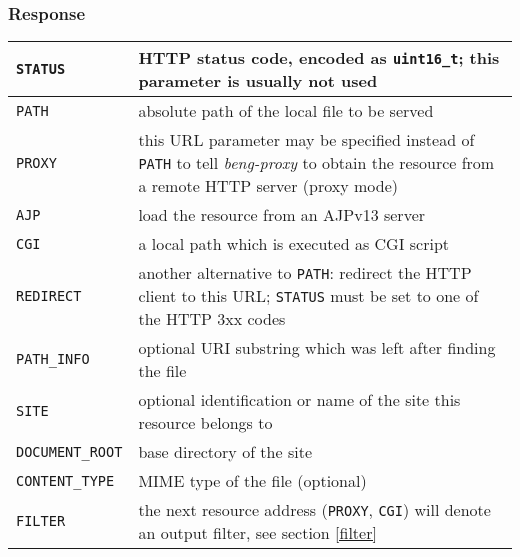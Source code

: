 \documentclass[a4paper,12pt]{article}
\begin{document}
\subsubsection{Response}

\begin{tabular}{|l|p{10cm}|}
\hline
\texttt{STATUS} & HTTP status code, encoded as \texttt{uint16\_t};
this parameter is usually not used \\
\hline

\texttt{PATH} & absolute path of the local file to be served \\

\hline

\texttt{PROXY} & this URL parameter may be specified instead of
\texttt{PATH} to tell \emph{beng-proxy} to obtain the resource from a
remote HTTP server (proxy mode) \\

\hline

\texttt{AJP} & load the resource from an AJPv13 server \\

\hline

\texttt{CGI} & a local path which is executed as CGI script \\

\hline

\texttt{REDIRECT} & another alternative to \texttt{PATH}: redirect the
HTTP client to this URL; \texttt{STATUS} must be set to one of the
HTTP 3xx codes \\

\hline

\texttt{PATH\_INFO} & optional URI substring which was left after
finding the file \\

\hline

\texttt{SITE} & optional identification or name of the site this
resource belongs to \\

\hline

\texttt{DOCUMENT\_ROOT} & base directory of the site \\

\hline

\texttt{CONTENT\_TYPE} & MIME type of the file (optional) \\

\hline

\texttt{FILTER} & the next resource address (\texttt{PROXY},
\texttt{CGI}) will denote an output filter, see section \ref{filter}
\\


\end{tabular}
\end{document}
